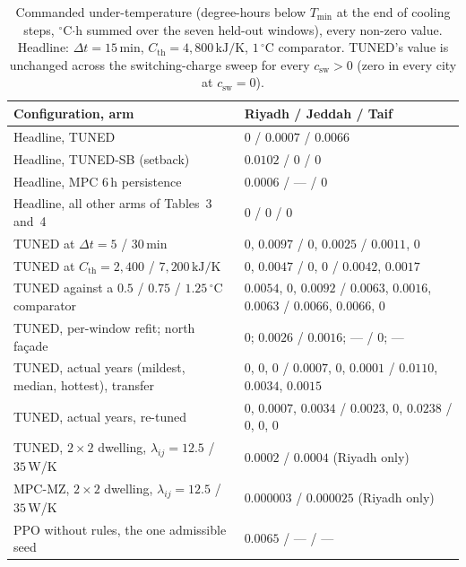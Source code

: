 \documentclass[11pt]{article}
\newcommand{\Tmin}{T_{\min}}
\newcommand{\Cth}{C_{\mathrm{th}}}
\newcommand{\csw}{c_{\mathrm{sw}}}
\newcommand{\lij}{\lambda_{ij}}
\begin{document}
\begin{table}[!ht]
\centering
\caption{Commanded under-temperature (degree-hours below $\Tmin$ at the end of
cooling steps, $^\circ$C$\cdot$h summed over the seven held-out windows), every
non-zero value. Headline: $\Delta t=15\,$min, $\Cth=4{,}800\,\text{kJ/K}$,
$1\,^\circ$C comparator. TUNED's value is unchanged across the switching-charge
sweep for every $\csw>0$ (zero in every city at $\csw=0$).}
\label{tab:s-cmd}
\small
\begin{tabularx}{\textwidth}{@{}lX@{}}
\toprule
Configuration, arm & Riyadh / Jeddah / Taif \\
\midrule
Headline, TUNED & $0$ / $0.0007$ / $0.0066$ \\
Headline, TUNED-SB (setback) & $0.0102$ / $0$ / $0$ \\
Headline, MPC $6\,$h persistence & $0.0006$ / --- / $0$ \\
Headline, all other arms of Tables~3 and~4 & $0$ / $0$ / $0$ \\
TUNED at $\Delta t=5$ / $30\,$min & $0$, $0.0097$ / $0$, $0.0025$ / $0.0011$, $0$ \\
TUNED at $\Cth=2{,}400$ / $7{,}200\,\text{kJ/K}$ & $0$, $0.0047$ / $0$, $0$ / $0.0042$, $0.0017$ \\
TUNED against a $0.5$ / $0.75$ / $1.25\,^\circ$C comparator & $0.0054$, $0$, $0.0092$ / $0.0063$, $0.0016$, $0.0063$ / $0.0066$, $0.0066$, $0$ \\
TUNED, per-window refit; north façade & $0$; $0.0026$ / $0.0016$; --- / $0$; --- \\
TUNED, actual years (mildest, median, hottest), transfer & $0$, $0$, $0$ / $0.0007$, $0$, $0.0001$ / $0.0110$, $0.0034$, $0.0015$ \\
TUNED, actual years, re-tuned & $0$, $0.0007$, $0.0034$ / $0.0023$, $0$, $0.0238$ / $0$, $0$, $0$ \\
TUNED, $2\times2$ dwelling, $\lij=12.5$ / $35\,$W/K & $0.0002$ / $0.0004$ (Riyadh only) \\
MPC-MZ, $2\times2$ dwelling, $\lij=12.5$ / $35\,$W/K & $0.000003$ / $0.000025$ (Riyadh only) \\
PPO without rules, the one admissible seed & $0.0065$ / --- / --- \\
\bottomrule
\end{tabularx}
\end{table}
\end{document}
